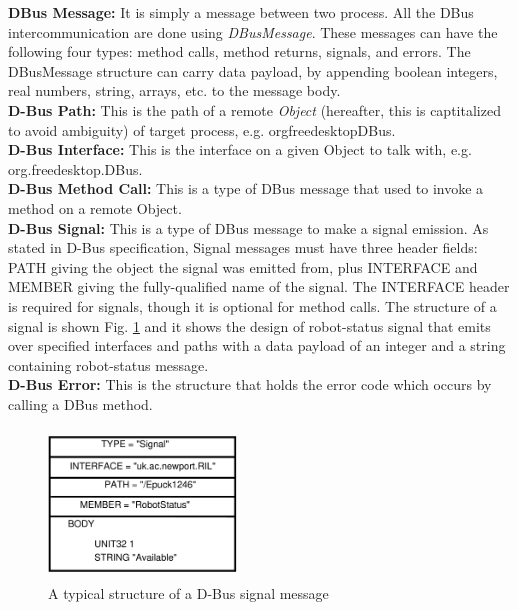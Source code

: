 \documentclass{ifacconf}
\begin{document}
\textbf{DBus Message: }
It is simply a message between two process. All the DBus intercommunication are done using \textit{DBusMessage}. These messages can have the following four types: method calls, method returns, signals, and errors. The DBusMessage structure can carry data payload, by appending boolean integers, real numbers, string, arrays, etc. to the message body.\\ 
\textbf{D-Bus Path: }
This is the path of a remote \textit{Object} (hereafter, this is captitalized to avoid ambiguity) of target process, e.g. \/org\/freedesktop\/DBus.\\
\textbf{D-Bus Interface: }
This is the interface on a given Object to talk with, e.g. org.freedesktop.DBus.\\
\textbf{D-Bus Method Call: }
This is a type of DBus message that used to invoke a method on a remote Object.\\
\textbf{D-Bus Signal: }
This is a type of DBus message to make a signal emission. As stated in D-Bus specification, Signal messages must have three header fields: PATH giving the object the signal was emitted from, plus INTERFACE and MEMBER giving the fully-qualified name of the signal. The INTERFACE header is required for signals, though it is optional for method calls. The structure of a signal is shown Fig. \ref{fig:dbus-signal-protocol} and it shows the design of robot-status signal that emits over specified interfaces and paths with a data payload of an integer and a string containing robot-status message.\\
\textbf{D-Bus Error: }
This is the structure that holds the error code which occurs by calling a DBus method.
\begin{figure}
\begin{center}
\includegraphics[width=5cm,height=4cm]{./dia-files/dbus-signal-protocol} %
\caption{A typical structure of a D-Bus signal message} 
\label{fig:dbus-signal-protocol}
\end{center}
\end{figure}
\end{document}
